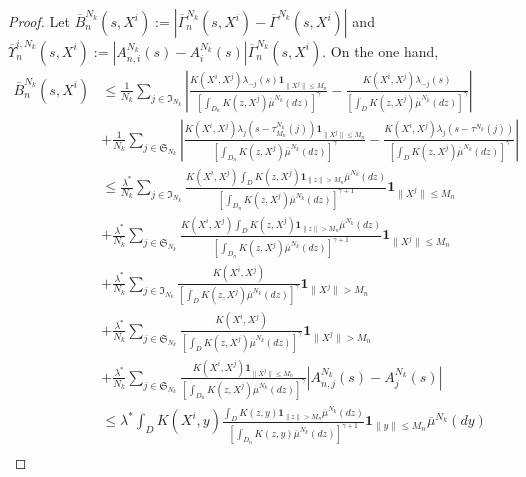 \documentclass[notitlepage,reqno,11pt]{amsart}
\numberwithin{equation}{section}
\begin{document}
\begin{proof}
	
Let $\displaystyle \overline{B}_n^{N_k}(s,X^i):= \left| \overline{\Gamma}_{n}^{N_k}(s,X^i)-\overline{\Gamma}^{N_k}(s,X^i)\right|$ and  $\displaystyle \overline{\Upsilon}_n^{i,N_k}(s,X^i):=\left| A^{N_k}_{n,i}(s)-A^{N_k}_{i}(s) \right| \overline{\Gamma}_{n}^{N_k}(s,X^i)$.
On the one hand,
\begin{align}
\overline{B}_n^{N_k}(s,X^i )&\leq  \frac{1}{N_k} \displaystyle  \sum_{j\in\mathfrak{I}_{N_k}} \left|\frac{K(X^{i},X^{j})\lambda_{-j}(s)\mathbf{1}_{\|X^j\|\leq M_n}}{\left[\displaystyle \int_{D_n} K(z,X^j)\overline{\mu}^{N_k}(dz)\right]^{\gamma}}- \frac{K(X^{i},X^{j})\lambda_{-j}(s)}{\left[\displaystyle \int_D K(z,X^j)\overline{\mu}^{N_k}(dz)\right]^{\gamma}}\right| \nonumber\\
&+\frac{1}{N_k}\sum_{j\in\mathfrak{S}_{N_k}} \left|\frac{K(X^{i},X^{j})\lambda_{j}(s- \tau_{M_n}^{N_k}(j))\mathbf{1}_{\|X^j\|\leq M_n}}{\left[\displaystyle \int_{D_n} K(z,X^j)\overline{\mu}^{N_k}(dz)\right]^{\gamma}}-\frac{K(X^{i},X^{j})\lambda_{j}(s- \tau^{N_k}(j))}{\left[\displaystyle \int_D K(z,X^j)\overline{\mu}^{N_k}(dz)\right]^{\gamma}}\right|\nonumber\\
&\leq \frac{\lambda^*}{N_k} \displaystyle  \sum_{j\in\mathfrak{I}_{N_k}} \frac{K(X^{i},X^{j})\displaystyle \int_D K(z,X^j)\mathbf{1}_{\|z\|> M_n}\overline{\mu}^{N_k}(dz)}{\left[\displaystyle \int_{D_n} K(z,X^j)\overline{\mu}^{N_k}(dz)\right]^{\gamma+1}}\mathbf{1}_{\|X^j\|\leq M_n}\nonumber\\
&+\frac{\lambda^*}{N_k} \displaystyle  \sum_{j\in\mathfrak{S}_{N_k}} \frac{K(X^{i},X^{j})\displaystyle \int_D K(z,X^j)\mathbf{1}_{\|z\|> M_n}\overline{\mu}^{N_k}(dz)}{\left[\displaystyle \int_{D_n} K(z,X^j)\overline{\mu}^{N_k}(dz)\right]^{\gamma+1}}\mathbf{1}_{\|X^j\|\leq M_n}\nonumber\\
&+\frac{\lambda^*}{N_k} \displaystyle  \sum_{j\in\mathfrak{I}_{N_k}}\frac{K(X^{i},X^{j})}{\left[\displaystyle \int_D K(z,X^j)\overline{\mu}^{N_k}(dz)\right]^{\gamma}}\mathbf{1}_{\|X^j\|>M_n}\nonumber\\
&+\frac{\lambda^*}{N_k} \displaystyle  \sum_{j\in\mathfrak{S}_{N_k}}\frac{K(X^{i},X^{j})}{\left[\displaystyle \int_D K(z,X^j)\overline{\mu}^{N_k}(dz)\right]^{\gamma}}\mathbf{1}_{\|X^j\|>M_n}\nonumber\\
&+\frac{\lambda^*}{N_k}\sum_{j\in\mathfrak{S}_{N_k}} \frac{K(X^{i},X^{j})\mathbf{1}_{\|X^j\|\leq M_n}}{\left[\displaystyle \int_{D_n} K(z,X^j)\overline{\mu}^{N_k}(dz)\right]^{\gamma}}\left| A_{n,j}^{N_k}(s)-A_{j}^{N_k}(s)\right|\nonumber\\
&\leq \lambda^* \displaystyle \int_D K(X^{i},y)\frac{\displaystyle \int_D K(z,y)\mathbf{1}_{\|z\|> M_n}\overline{\mu}^{N_k}(dz)}{\left[\displaystyle \int_{D_n} K(z,y) \overline{\mu}^{N_k}(dz)\right]^{\gamma+1}}\mathbf{1}_{\|y\|\leq M_n}\overline{\mu}^{N_k}(dy)\nonumber\\

\end{align}
\end{proof}
\end{document}

